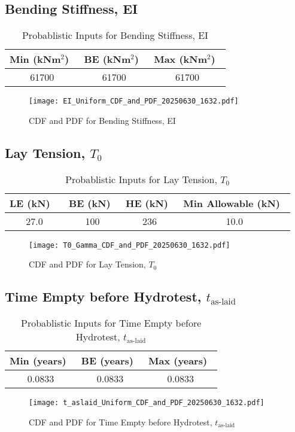 \documentclass{article}
\begin{document}
\subsection*{Bending Stiffness, EI}
\begin{table}[h!]
\centering
\caption{Probablistic Inputs for Bending Stiffness, EI}
\begin{tabular}{|c|c|c|}
\hline
Min (kNm$^2$)\ & BE (kNm$^2$)\ & Max (kNm$^2$)\ \\
\hline
61700 & 61700 & 61700 \\
\hline
\end{tabular}
\end{table}
\begin{figure}[h!]
\centering
\texttt{[image: EI\_Uniform\_CDF\_and\_PDF\_20250630\_1632.pdf]}
\caption{CDF and PDF for Bending Stiffness, EI}
\end{figure}
\clearpage
\subsection*{Lay Tension, $T_0$}
\begin{table}[h!]
\centering
\caption{Probablistic Inputs for Lay Tension, $T_0$}
\begin{tabular}{|c|c|c|c|}
\hline
LE (kN) \ & BE (kN)\ & HE (kN)\ & Min Allowable (kN)\ \\
\hline
27.0 & 100 & 236 & 10.0 \\
\hline
\end{tabular}
\end{table}
\begin{figure}[h!]
\centering
\texttt{[image: T0\_Gamma\_CDF\_and\_PDF\_20250630\_1632.pdf]}
\caption{CDF and PDF for Lay Tension, $T_0$}
\end{figure}
\clearpage
\subsection*{Time Empty before Hydrotest, $t_{\text{as-laid}}$}
\begin{table}[h!]
\centering
\caption{Probablistic Inputs for Time Empty before Hydrotest, $t_{\text{as-laid}}$}
\begin{tabular}{|c|c|c|}
\hline
Min (years)\ & BE (years)\ & Max (years)\ \\
\hline
0.0833 & 0.0833 & 0.0833 \\
\hline
\end{tabular}
\end{table}
\begin{figure}[h!]
\centering
\texttt{[image: t\_aslaid\_Uniform\_CDF\_and\_PDF\_20250630\_1632.pdf]}
\caption{CDF and PDF for Time Empty before Hydrotest, $t_{\text{as-laid}}$}
\end{figure}
\clearpage
\end{document}
